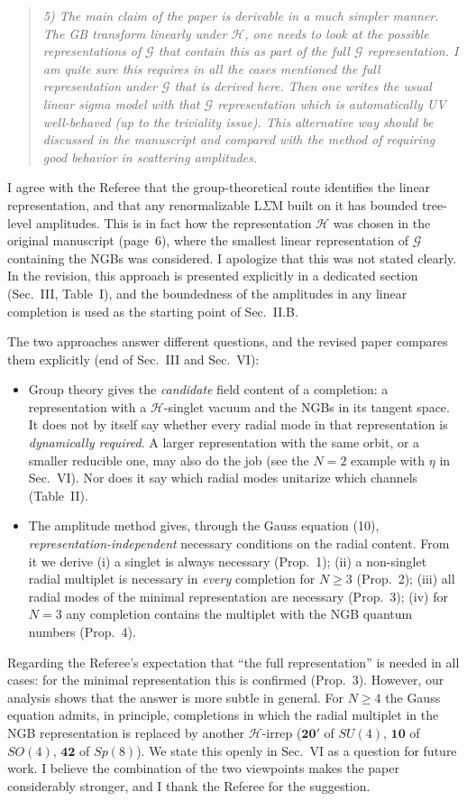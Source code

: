 \documentclass[11pt,a4paper]{article}
\newcommand{\referee}[1]{\begin{quote}\itshape\color{black!70}#1\end{quote}}
\newcommand{\Hf}{\mathcal{H}}
\begin{document}
\referee{5) The main claim of the paper is derivable in a much simpler manner. The GB transform linearly under $\mathcal{H}$, one needs to look at the possible representations of $\mathcal{G}$ that contain this as part of the full $\mathcal{G}$ representation. I am quite sure this requires in all the cases mentioned the full representation under $\mathcal{G}$ that is derived here. Then one writes the usual linear sigma model with that $\mathcal{G}$ representation which is automatically UV well-behaved (up to the triviality issue). This alternative way should be discussed in the manuscript and compared with the method of requiring good behavior in scattering amplitudes.}

I agree with the Referee that the group-theoretical route identifies the linear representation, and that any renormalizable L$\Sigma$M built on it has bounded tree-level amplitudes. This is in fact how the representation $\Hf$ was chosen in the original manuscript (page~6), where the smallest linear representation of $\mathcal G$ containing the NGBs was considered. I apologize that this was not stated clearly. In the revision, this approach is presented explicitly in a dedicated section (Sec.~III, Table~I), and the boundedness of the amplitudes in any linear completion is used as the starting point of Sec.~II.B.

The two approaches answer different questions, and the revised paper compares them explicitly (end of Sec.~III and Sec.~VI):
\begin{itemize}[leftmargin=*]
\item Group theory gives the \emph{candidate} field content of a completion: a representation with a $\mathcal{H}$-singlet vacuum and the NGBs in its tangent space. It does not by itself say whether every radial mode in that representation is \emph{dynamically required}. A larger representation with the same orbit, or a smaller reducible one, may also do the job (see the $N=2$ example with $\eta$ in Sec.~VI). Nor does it say which radial modes unitarize which channels (Table~II).
\item The amplitude method gives, through the Gauss equation (10), \emph{representation-independent} necessary conditions on the radial content. From it we derive (i) a singlet is always necessary (Prop.~1); (ii) a non-singlet radial multiplet is necessary in \emph{every} completion for $N\ge3$ (Prop.~2); (iii) all radial modes of the minimal representation are necessary (Prop.~3); (iv) for $N=3$ any completion contains the multiplet with the NGB quantum numbers (Prop.~4).
\end{itemize}
Regarding the Referee's expectation that ``the full representation'' is needed in all cases: for the minimal representation this is confirmed (Prop.~3). However, our analysis shows that the answer is more subtle in general. For $N\ge4$ the Gauss equation admits, in principle, completions in which the radial multiplet in the NGB representation is replaced by another $\mathcal{H}$-irrep ($\mathbf{20}'$ of $SU(4)$, $\mathbf{10}$ of $SO(4)$, $\mathbf{42}$ of $Sp(8)$). We state this openly in Sec.~VI as a question for future work. I believe the combination of the two viewpoints makes the paper considerably stronger, and I thank the Referee for the suggestion.
\end{document}
